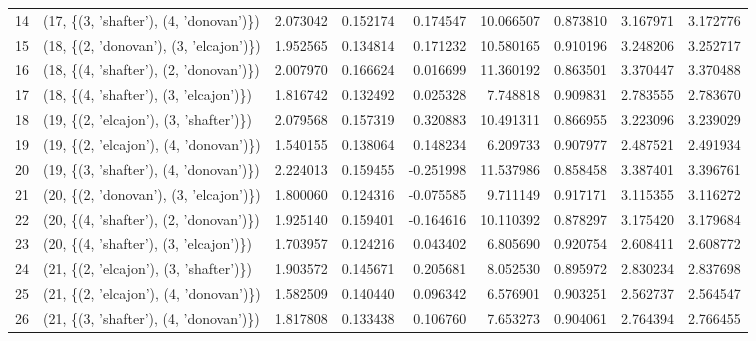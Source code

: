 \begin{tabular}{llrrrrrrr}
14 &  (17, \{(3, 'shafter'), (4, 'donovan')\}) &  2.073042 &   0.152174 &  0.174547 &  10.066507 &  0.873810 &   3.167971 &  3.172776 \\
15 &  (18, \{(2, 'donovan'), (3, 'elcajon')\}) &  1.952565 &   0.134814 &  0.171232 &  10.580165 &  0.910196 &   3.248206 &  3.252717 \\
16 &  (18, \{(4, 'shafter'), (2, 'donovan')\}) &  2.007970 &   0.166624 &  0.016699 &  11.360192 &  0.863501 &   3.370447 &  3.370488 \\
17 &  (18, \{(4, 'shafter'), (3, 'elcajon')\}) &  1.816742 &   0.132492 &  0.025328 &   7.748818 &  0.909831 &   2.783555 &  2.783670 \\
18 &  (19, \{(2, 'elcajon'), (3, 'shafter')\}) &  2.079568 &   0.157319 &  0.320883 &  10.491311 &  0.866955 &   3.223096 &  3.239029 \\
19 &  (19, \{(2, 'elcajon'), (4, 'donovan')\}) &  1.540155 &   0.138064 &  0.148234 &   6.209733 &  0.907977 &   2.487521 &  2.491934 \\
20 &  (19, \{(3, 'shafter'), (4, 'donovan')\}) &  2.224013 &   0.159455 & -0.251998 &  11.537986 &  0.858458 &   3.387401 &  3.396761 \\
21 &  (20, \{(2, 'donovan'), (3, 'elcajon')\}) &  1.800060 &   0.124316 & -0.075585 &   9.711149 &  0.917171 &   3.115355 &  3.116272 \\
22 &  (20, \{(4, 'shafter'), (2, 'donovan')\}) &  1.925140 &   0.159401 & -0.164616 &  10.110392 &  0.878297 &   3.175420 &  3.179684 \\
23 &  (20, \{(4, 'shafter'), (3, 'elcajon')\}) &  1.703957 &   0.124216 &  0.043402 &   6.805690 &  0.920754 &   2.608411 &  2.608772 \\
24 &  (21, \{(2, 'elcajon'), (3, 'shafter')\}) &  1.903572 &   0.145671 &  0.205681 &   8.052530 &  0.895972 &   2.830234 &  2.837698 \\
25 &  (21, \{(2, 'elcajon'), (4, 'donovan')\}) &  1.582509 &   0.140440 &  0.096342 &   6.576901 &  0.903251 &   2.562737 &  2.564547 \\
26 &  (21, \{(3, 'shafter'), (4, 'donovan')\}) &  1.817808 &   0.133438 &  0.106760 &   7.653273 &  0.904061 &   2.764394 &  2.766455 \\
\bottomrule
\end{tabular}
